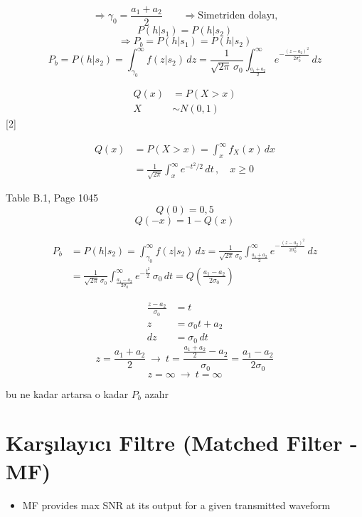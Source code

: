 \documentclass[11pt,a4paper]{article}
\begin{document}
\[ \Rightarrow \gamma_0=\frac{a_1+a_2}{2} \qquad \Rightarrow \text{Simetriden dolayı,} \]
\[ P(h|s_1)=P(h|s_2) \]
\[ \Rightarrow P_b=P(h|s_1)=P(h|s_2) \]
\[ P_b=P(h|s_2)=\int_{\gamma_0}^{\infty} f(z|s_2)\,dz=\frac{1}{\sqrt{2\pi}\,\sigma_0}\int_{\frac{a_1+a_2}{2}}^{\infty} e^{-\frac{(z-a_2)^2}{2\sigma_0^2}}\,dz \]

\[ \begin{aligned} Q(x)&=P(X>x) \\ X&\sim N(0,1) \end{aligned} \]
[2]

\[ \begin{aligned} Q(x)&=P(X>x)=\int_{x}^{\infty} f_X(x)\,dx \\ &=\frac{1}{\sqrt{2\pi}}\int_{x}^{\infty} e^{-t^2/2}\,dt\,,\quad x\ge 0 \end{aligned} \]

Table B.1, Page 1045
\[ Q(0)=0{,}5 \]
\[ Q(-x)=1-Q(x) \]

\[
\begin{aligned}
P_b&=P(h|s_2)=\int_{\gamma_0}^{\infty} f(z|s_2)\,dz=\frac{1}{\sqrt{2\pi}\,\sigma_0}\int_{\frac{a_1+a_2}{2}}^{\infty} e^{-\frac{(z-a_2)^2}{2\sigma_0^2}}\,dz \\
&=\frac{1}{\sqrt{2\pi}\,\sigma_0}\int_{\frac{a_1-a_2}{2\sigma_0}}^{\infty} e^{-\frac{t^2}{2}}\,\sigma_0\,dt=Q\!\left(\frac{a_1-a_2}{2\sigma_0}\right)
\end{aligned}
\]

\[
\begin{aligned}
\frac{z-a_2}{\sigma_0}&=t \\
z&=\sigma_0 t+a_2 \\
dz&=\sigma_0\,dt
\end{aligned}
\]
\[ z=\frac{a_1+a_2}{2}\ \rightarrow\ t=\frac{\frac{a_1+a_2}{2}-a_2}{\sigma_0}=\frac{a_1-a_2}{2\sigma_0} \]
\[ z=\infty\ \rightarrow\ t=\infty \]


bu  ne kadar artarsa o kadar $P_b$ azalır

\section{Karşılayıcı Filtre (Matched Filter - MF)}
\begin{itemize}
\item MF provides max SNR at its output for a given transmitted waveform
\end{itemize}
\end{document}
